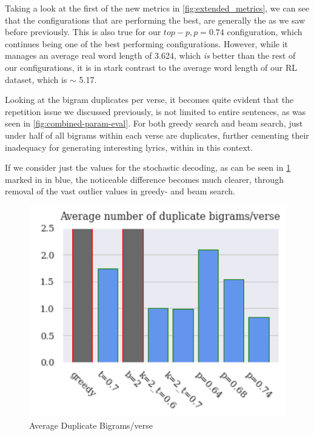 Taking a look at the first of the new metrics in \cref{fig:extended_metrics}, we can see that the configurations that are performing the best, are generally the as we saw before previously. This is also true for our $top-p, p=0.74$ configuration, which continues being one of the best performing configurations. However, while it manages an average real word length of 3.624, which \textit{is} better than the rest of our configurations, it is in stark contrast to the average word length of our RL dataset, which is $\sim$ 5.17.

Looking at the bigram duplicates per verse, it becomes quite evident that the repetition issue we discussed previously, is not limited to entire sentences, as was seen in \cref{fig:combined-param-eval}. For both greedy search and beam search, just under half of all bigrams within each verse are duplicates, further cementing their inadequacy for generating interesting lyrics, within in this context.

If we consider just the values for the stochastic decoding, as can be seen in \cref{fig:avg-bigrams} marked in in blue, the noticeable difference becomes much clearer, through removal of the vast outlier values in greedy- and beam search.

\begin{figure}[H]
    \centering
    \includegraphics[scale=0.3,keepaspectratio=true]{figures/avg_bigrams.png}
    \caption{Average Duplicate Bigrams/verse}
    \label{fig:avg-bigrams}
\end{figure}


